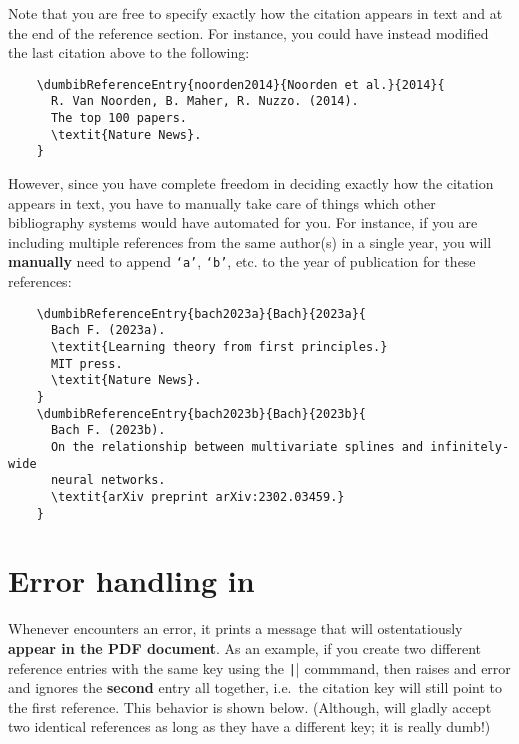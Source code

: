 \documentclass[letter, 11pt]{article}
\begin{document}

  Note that you are free to specify exactly how the citation appears in text and at the end of the reference section. For instance, you could have instead modified the last citation above to the following:
  \begin{verbatim}
    \dumbibReferenceEntry{noorden2014}{Noorden et al.}{2014}{
      R. Van Noorden, B. Maher, R. Nuzzo. (2014).
      The top 100 papers.
      \textit{Nature News}.
    }
  \end{verbatim}
  However, since you have complete freedom in deciding exactly how the citation appears in text, you have to manually take care of things which other bibliography systems would have automated for you. For instance, if you are including multiple references from the same author(s) in a single year, you will \textbf{manually} need to append \texttt{`a'}, \texttt{`b'}, etc. to the year of publication for these references:
  \begin{verbatim}
    \dumbibReferenceEntry{bach2023a}{Bach}{2023a}{
      Bach F. (2023a).
      \textit{Learning theory from first principles.}
      MIT press.
      \textit{Nature News}.
    }
    \dumbibReferenceEntry{bach2023b}{Bach}{2023b}{
      Bach F. (2023b).
      On the relationship between multivariate splines and infinitely-wide
      neural networks.
      \textit{arXiv preprint arXiv:2302.03459.}
    }
  \end{verbatim}

  
  
  \section{Error handling in \dumbib}
  Whenever \dumbib encounters an error, it prints a message that will ostentatiously \textbf{appear in the PDF document}. As an example, if you create two different reference entries with the same key using the \texttt|\dumbibReferenceEntry{}| commmand, then \dumbib raises and error and ignores the \textbf{second} entry all together, i.e.\ the citation key will still point to the first reference. This behavior is shown below. (Although, \dumbib will gladly accept two identical references as long as they have a different key; it is really dumb!)
\end{document}
